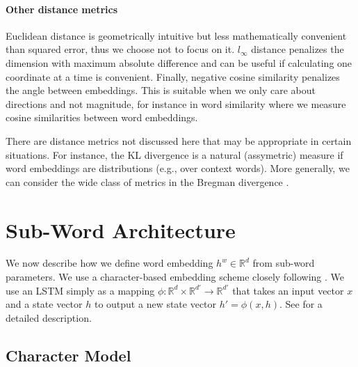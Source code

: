 \documentclass[11pt,letterpaper,UTF8]{article}
\newcommand{\R}{\ensuremath{\mathbb{R}}}
\newcommand{\ra}{\ensuremath{\rightarrow}}
\begin{document}
\begin{CJK}{UTF8}{gbsn}
\paragraph{Other distance metrics}
Euclidean distance is geometrically intuitive but less mathematically convenient than squared error,
thus we choose not to focus on it.
$l_\infty$ distance penalizes the dimension with maximum absolute difference
and can be useful if calculating one coordinate at a time is convenient.
Finally, negative cosine similarity penalizes the angle between embeddings.
This is suitable when we only care about directions and not magnitude,
for instance in word similarity where we measure cosine similarities between word embeddings.

There are distance metrics not discussed here that may be appropriate in certain situations.
For instance, the KL divergence is a natural (assymetric) measure if word embeddings are distributions (e.g., over context words).
More generally, we can consider the wide class of metrics in the Bregman divergence \cite{banerjee2005clustering}.


\section{Sub-Word Architecture}
We now describe how we define word embedding $h^w \in \R^d$ from sub-word parameters.
We use a character-based embedding scheme closely following .
We use an LSTM simply as a mapping $\phi:\R^d \times \R^{d'} \ra \R^{d'}$
that takes an input vector $x$ and a state vector $h$ to output a new state vector $h' = \phi(x, h)$.
See  for a detailed description.

\subsection{Character Model}
\label{sec:char-units}


\end{CJK}
\end{document}

